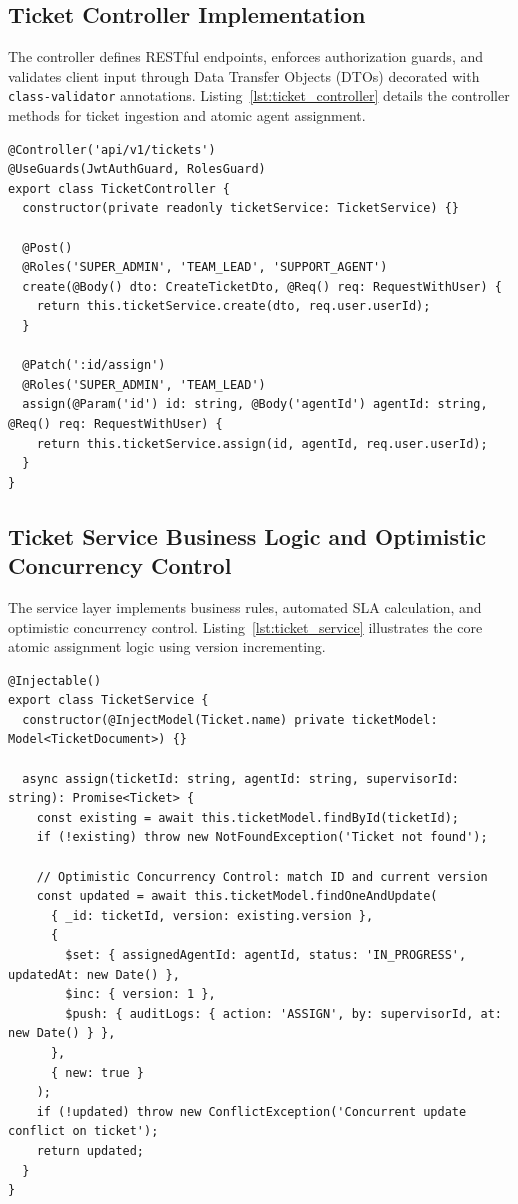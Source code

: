 \subsection{Ticket Controller Implementation}
The controller defines RESTful endpoints, enforces authorization guards, and validates client input through Data Transfer Objects (DTOs) decorated with \texttt{class-validator} annotations. Listing~\ref{lst:ticket_controller} details the controller methods for ticket ingestion and atomic agent assignment.

\begin{lstlisting}[caption={RESTful Ticket Management Controller.}, label={lst:ticket_controller}]
@Controller('api/v1/tickets')
@UseGuards(JwtAuthGuard, RolesGuard)
export class TicketController {
  constructor(private readonly ticketService: TicketService) {}

  @Post()
  @Roles('SUPER_ADMIN', 'TEAM_LEAD', 'SUPPORT_AGENT')
  create(@Body() dto: CreateTicketDto, @Req() req: RequestWithUser) {
    return this.ticketService.create(dto, req.user.userId);
  }

  @Patch(':id/assign')
  @Roles('SUPER_ADMIN', 'TEAM_LEAD')
  assign(@Param('id') id: string, @Body('agentId') agentId: string, @Req() req: RequestWithUser) {
    return this.ticketService.assign(id, agentId, req.user.userId);
  }
}
\end{lstlisting}

\subsection{Ticket Service Business Logic and Optimistic Concurrency Control}
The service layer implements business rules, automated SLA calculation, and optimistic concurrency control. Listing~\ref{lst:ticket_service} illustrates the core atomic assignment logic using version incrementing.

\begin{lstlisting}[caption={Ticket Service with Optimistic Concurrency Control.}, label={lst:ticket_service}]
@Injectable()
export class TicketService {
  constructor(@InjectModel(Ticket.name) private ticketModel: Model<TicketDocument>) {}

  async assign(ticketId: string, agentId: string, supervisorId: string): Promise<Ticket> {
    const existing = await this.ticketModel.findById(ticketId);
    if (!existing) throw new NotFoundException('Ticket not found');

    // Optimistic Concurrency Control: match ID and current version
    const updated = await this.ticketModel.findOneAndUpdate(
      { _id: ticketId, version: existing.version },
      {
        $set: { assignedAgentId: agentId, status: 'IN_PROGRESS', updatedAt: new Date() },
        $inc: { version: 1 },
        $push: { auditLogs: { action: 'ASSIGN', by: supervisorId, at: new Date() } },
      },
      { new: true }
    );
    if (!updated) throw new ConflictException('Concurrent update conflict on ticket');
    return updated;
  }
}
\end{lstlisting}

